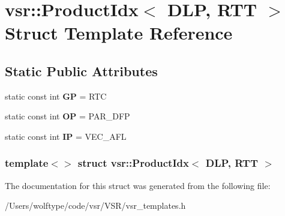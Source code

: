\hypertarget{structvsr_1_1_product_idx_3_01_d_l_p_00_01_r_t_t_01_4}{\section{vsr\-:\-:Product\-Idx$<$ D\-L\-P, R\-T\-T $>$ Struct Template Reference}
\label{structvsr_1_1_product_idx_3_01_d_l_p_00_01_r_t_t_01_4}
}
\subsection*{Static Public Attributes}
\begin{DoxyCompactItemize}
\item 
\hypertarget{structvsr_1_1_product_idx_3_01_d_l_p_00_01_r_t_t_01_4_af472ec6668faea8d328a5867cc176955}{static const int {\bfseries G\-P} = R\-T\-C}\label{structvsr_1_1_product_idx_3_01_d_l_p_00_01_r_t_t_01_4_af472ec6668faea8d328a5867cc176955}

\item 
\hypertarget{structvsr_1_1_product_idx_3_01_d_l_p_00_01_r_t_t_01_4_af890ba6e76b4c4f7a7c4ec1dc2b7d497}{static const int {\bfseries O\-P} = P\-A\-R\-\_\-\-D\-F\-P}\label{structvsr_1_1_product_idx_3_01_d_l_p_00_01_r_t_t_01_4_af890ba6e76b4c4f7a7c4ec1dc2b7d497}

\item 
\hypertarget{structvsr_1_1_product_idx_3_01_d_l_p_00_01_r_t_t_01_4_aa2e5ee6dbcf212ac22af32aad872d106}{static const int {\bfseries I\-P} = V\-E\-C\-\_\-\-A\-F\-L}\label{structvsr_1_1_product_idx_3_01_d_l_p_00_01_r_t_t_01_4_aa2e5ee6dbcf212ac22af32aad872d106}

\end{DoxyCompactItemize}
\subsubsection*{template$<$$>$ struct vsr\-::\-Product\-Idx$<$ D\-L\-P, R\-T\-T $>$}



The documentation for this struct was generated from the following file\-:\begin{DoxyCompactItemize}
\item 
/\-Users/wolftype/code/vsr/\-V\-S\-R/vsr\-\_\-templates.\-h\end{DoxyCompactItemize}

